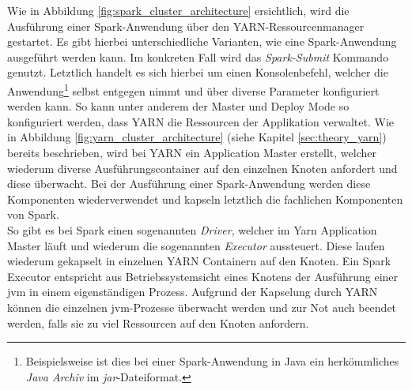 \noindent
Wie in Abbildung \ref{fig:spark_cluster_architecture} ersichtlich, wird die Ausführung einer Spark-Anwendung über den YARN-Ressourcenmanager gestartet. Es gibt hierbei unterschiedliche Varianten, wie eine Spark-Anwendung ausgeführt werden kann. 
Im konkreten Fall wird das \textit{Spark-Submit} Kommando genutzt. Letztlich handelt es sich hierbei um einen Konsolenbefehl, welcher die Anwendung\footnote{Beispielsweise ist dies bei einer Spark-Anwendung in Java ein herkömmliches \textit{Java Archiv} im \textit{\gls{jar}}-Dateiformat.} selbst entgegen nimmt und über diverse Parameter konfiguriert werden kann. 
So kann unter anderem der Master und Deploy Mode so konfiguriert werden, dass YARN die Ressourcen der Applikation verwaltet. Wie in Abbildung \ref{fig:yarn_cluster_architecture} (siehe Kapitel \ref{sec:theory_yarn}) bereits beschrieben, wird bei YARN ein Application Master erstellt, welcher wiederum diverse Ausführungscontainer auf den einzelnen Knoten anfordert und diese überwacht. Bei der Ausführung einer Spark-Anwendung werden diese Komponenten wiederverwendet und kapseln letztlich die fachlichen Komponenten von Spark.\\
So gibt es bei Spark einen sogenannten \textit{Driver}, welcher im Yarn Application Master läuft und wiederum die sogenannten \textit{Executor} aussteuert. Diese laufen wiederum gekapselt in einzelnen YARN Containern auf den Knoten. Ein Spark Executor entspricht aus Betriebssystemsicht eines Knotens der Ausführung einer \gls{jvm} in einem eigenständigen Prozess. Aufgrund der Kapselung durch YARN können die einzelnen \gls{jvm}-Prozesse überwacht werden und zur Not auch beendet werden, falls sie zu viel Ressourcen auf den Knoten anfordern.\\

